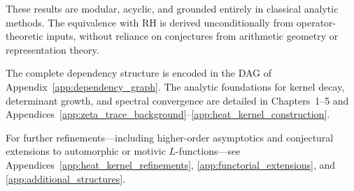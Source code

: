 \medskip

\noindent
These results are modular, acyclic, and grounded entirely in classical analytic methods. The equivalence with RH is derived unconditionally from operator-theoretic inputs, without reliance on conjectures from arithmetic geometry or representation theory.

\medskip

\noindent
The complete dependency structure is encoded in the DAG of Appendix~\ref{app:dependency_graph}. The analytic foundations for kernel decay, determinant growth, and spectral convergence are detailed in Chapters~1–5 and Appendices~\ref{app:zeta_trace_background}–\ref{app:heat_kernel_construction}.

\medskip

\noindent
For further refinements—including higher-order asymptotics and conjectural extensions to automorphic or motivic \( L \)-functions—see Appendices~\ref{app:heat_kernel_refinements}, \ref{app:functorial_extensions}, and \ref{app:additional_structures}.

